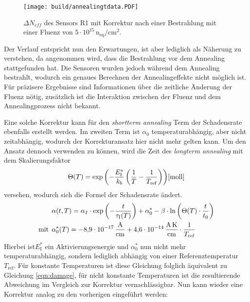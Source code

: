 \begin{figure}[!htb]
  \centering
    \texttt{[image: build/annealingtdata.PDF]}
\caption{$\Delta N_{eff}$ des Sensors R1 mit Korrektur nach einer Bestrahlung mit einer Fluenz von $5\cdot 10^{15} \, \mathrm{n_{eq}/cm^2}$.}
\label{fig:korrektur_N_eff}
\end{figure}



Der Verlauf entspricht nun den Erwartungen, ist aber lediglich als Näherung zu verstehen, da angenommen
wird, dass die Bestrahlung vor dem Annealing stattgefunden hat. Die Sensoren wurden jedoch
während dem Annealing bestrahlt, wodurch ein genaues Berechnen der Annealingeffekte nicht
möglich ist. Für präzisere Ergebnisse sind Informationen über die zeitliche Änderung der Fluenz nötig,
zusätzlich ist die Interaktion zwischen der Fluenz und dem Annealingprozess nicht bekannt.


Eine solche Korrektur kann für den \textit{shortterm annealing} Term der Schadensrate ebenfalls erstellt werden.
Im zweiten Term ist $\alpha_{0}$ temperaturabhängig, aber nicht zeitabhängig,
wodurch der Korrekturansatz hier nicht mehr gelten kann. Um den Ansatz dennoch
verwenden zu können, wird die Zeit des \textit{longterm annealing} mit dem
Skalierungsfaktor
\begin{align}
  \Theta(T) =  \exp{\left(-\frac{E_{\mathrm{I}}^*}{k_b}\left(\frac{1}{T}-\frac{1}{T_{\mathrm{ref}}}\right)\right)} \text{\cite{moll}} \\
\end{align}
versehen, wodurch sich die Formel der Schadensrate ändert.
\begin{align}
  &\alpha(t, T) = \alpha_I \cdot \exp{\left(-\frac{t}{\tau_{\mathrm{I}}(T)}\right)} + \alpha_{\mathrm{0}}^{*} -\beta \cdot \ln{\left(\Theta(T) \cdot \frac{t}{t_{\mathrm{0}}}\right)} \\
  \medskip
  \text{mit}\:\: &\alpha^*_{\mathrm{0}}(T) = \SI{-8.9e-17}{\ampere\per\centi\meter} + \SI{4.6e-14}{\ampere\kelvin\per\centi\meter} \cdot \frac{1}{T_{\mathrm{ref}}}
\end{align}
Hierbei ist$E_{\mathrm{I}}^*$ ein Aktivierungsenergie und $\alpha^*_{0}$ nun nicht mehr temperaturabhängig,
sondern lediglich abhängig von einer Referenztemperatur $T_{\mathrm{ref}}$. Für konstante Temperaturen
ist diese Gleichung folglich äquivalent zu Gleichung \ref{eqn:damage}, für nicht
konstante Temperaturen ist die resultierende Abweichung im Vergleich zur Korrektur vernachlässigbar.
Nun kann wieder eine Korrektur analog zu den vorherigen eingeführt werden:

